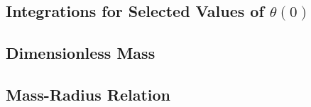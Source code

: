 \documentclass[11pt]{article} %
\begin{document}
\subsection*{Integrations for Selected Values of $\theta(0)$}


\subsection*{Dimensionless Mass}

\subsection*{Mass-Radius Relation}
\end{document}
